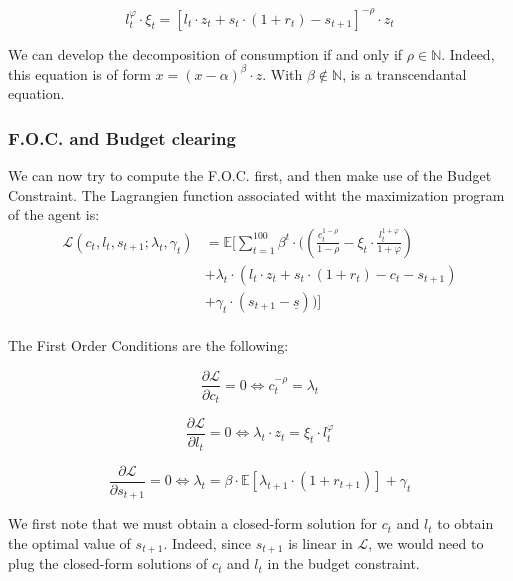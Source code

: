 \documentclass{article}
\begin{document}
\begin{equation}
    l_{t}^{\varphi}\cdot \xi_{t} = \left[l_{t}\cdot z_{t} + s_{t}\cdot(1+r_{t})- s_{t+1}\right]^{-\rho}\cdot z_{t}
\end{equation}

We can develop the decomposition of consumption if and only if $\rho \in \mathbb{N}$.
Indeed, this equation is of form $x = (x-\alpha)^{\beta} \cdot z$.
With $\beta\notin \mathbb{N}$, is a transcendantal equation.

\subsubsection{F.O.C. and Budget clearing}

We can now try to compute the F.O.C. first, and then make use of the Budget Constraint.
The Lagrangien function associated witht the maximization program of the agent is: 
\begin{equation}
    \begin{split}
        \mathcal{L}(c_{t},l_{t},s_{t+1};\lambda_t,\gamma_{t}) &
        = \mathbb{E}\Big[\sum_{t=1}^{100} \beta^{t}\cdot ((\frac{c_{t}^{1-\rho}}{1-\rho}-\xi_{t}\cdot\frac{l_{t}^{1+\varphi}}{1+\varphi}) \\
        & +\lambda_{t}\cdot \left(l_{t}\cdot z_{t}+s_{t}\cdot (1+r_{t})-c_{t}-s_{t+1}\right) \\ 
        & + \gamma_{t}\cdot \left(s_{t+1}-\underline{s}\right))\Big] \\ 
    \end{split}
\end{equation}

The First Order Conditions are the following:

$$\frac{\partial \mathcal{L}}{\partial c_{t}} = 0 \iff c_{t}^{-\rho} = \lambda_{t}$$


$$\frac{\partial \mathcal{L}}{\partial l_{t}} = 0 \iff \lambda_{t}\cdot z_{t} = \xi_{t}\cdot l_{t}^{\varphi}$$


$$\frac{\partial \mathcal{L}}{\partial s_{t+1}} = 0 \iff \lambda_{t} = \beta \cdot \mathbb{E}\left[\lambda_{t+1}\cdot (1+r_{t+1})\right] + \gamma_{t}$$

We first note that we must obtain a closed-form solution for $c_{t}$ and $l_{t}$ to obtain 
the optimal value of $s_{t+1}$. 
Indeed, since $s_{t+1}$ is linear in $\mathcal{L}$, we would need to plug the closed-form
solutions of $c_{t}$ and $l_{t}$ in the budget constraint. \\
\end{document}
